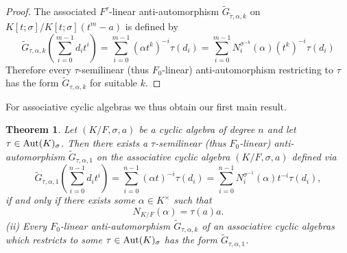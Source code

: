 \documentclass{amsart}
\theoremstyle{plain}
\newtheorem{theorem}{Theorem}[section]
\theoremstyle{definition}
\numberwithin{equation}{section}
\numberwithin{figure}{section}
\begin{document}
\begin{proof}
The associated
 $F^\tau$-linear anti-automorphism $\widetilde G_{\tilde\tau,\alpha,k} $ on $K[t;\sigma]/K[t;\sigma](t^m-a)$
 is defined by
 $$\widetilde G_{\tau,\alpha,k}(\sum_{i=0}^{m-1}d_it^i)= \sum_{i=0}^{m-1} (\alpha t^k)^{-i}\tau(d_i) =\sum_{i=0}^{m-1} N_i^{\sigma^{-k}}(\alpha) (t^{k})^{-i}\tau(d_i)$$
Therefore every $\tau$-semilinear (thus $F_0$-linear) anti-automorphism restricting to $\tau$ has the form $\widetilde G_{\tau,\alpha,k}$ for suitable $k$.
 \end{proof}

For associative cyclic algebras we thus obtain our first main result.

\begin{theorem}\label{thm:mainassociative cyclic1}
 Let  $(K/F,\sigma,a)$ be a cyclic algebra of degree $n$ and let $\tau \in {\rm Aut}(K)_\sigma$.
  Then there exists a $\tau$-semilinear (thus $F_0$-linear) anti-automorphism $\widetilde G_{\tau,\alpha,1}$ on the associative cyclic algebra $(K/F,\sigma,a)$ defined via
$$\widetilde G_{\tau,\alpha,1}(\sum_{i=0}^{n-1}d_it^i) =\sum_{i=0}^{n-1}(\alpha t)^{-i} \tau(d_i)= \sum_{i=0}^{n-1} N_i^{\sigma^{-1}}(\alpha) t^{-i} \tau(d_i),$$
 if and only if  there exists  some $\alpha\in K^\times$ such that
$$N_{K/F}( \alpha)= \tau(a)a.$$
 (ii) Every  $F_0$-linear anti-automorphism $\widetilde G_{\tau,\alpha,k}$  of an associative cyclic algebras which restricts  to some  $\tau \in {\rm Aut}(K)_\sigma$  has the form $\widetilde G_{\tau,\alpha,1}$.
\end{theorem}
\end{document}
